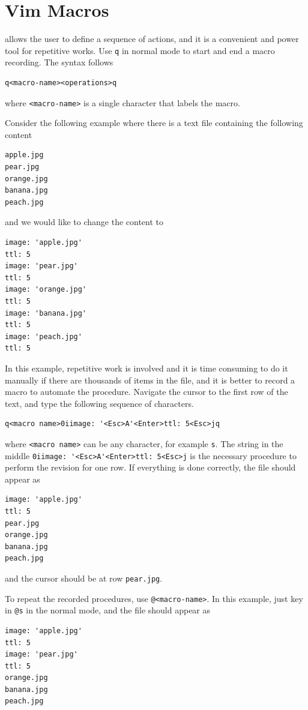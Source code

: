 \section{Vim Macros}

 allows the user to define a sequence of actions, and it is a convenient and power tool for repetitive works. Use \verb|q| in normal mode to start and end a macro recording. The syntax follows
\begin{lstlisting}
q<macro-name><operations>q
\end{lstlisting}
where \verb|<macro-name>| is a single character that labels the macro.

Consider the following example where there is a text file containing the following content
\begin{lstlisting}
apple.jpg
pear.jpg
orange.jpg
banana.jpg
peach.jpg
\end{lstlisting}
and we would like to change the content to
\begin{lstlisting}
image: 'apple.jpg'
ttl: 5
image: 'pear.jpg'
ttl: 5
image: 'orange.jpg'
ttl: 5
image: 'banana.jpg'
ttl: 5
image: 'peach.jpg'
ttl: 5
\end{lstlisting}

In this example, repetitive work is involved and it is time consuming to do it manually if there are thousands of items in the file, and it is better to record a macro to automate the procedure. Navigate the cursor to the first row of the text, and type the following sequence of characters.
\begin{lstlisting}
q<macro name>0iimage: '<Esc>A'<Enter>ttl: 5<Esc>jq
\end{lstlisting}
where \verb|<macro name>| can be any character, for example \verb|s|. The string in the middle \verb|0iimage: '<Esc>A'<Enter>ttl: 5<Esc>j| is the necessary procedure to perform the revision for one row. If everything is done correctly, the file should appear as
\begin{lstlisting}
image: 'apple.jpg'
ttl: 5
pear.jpg
orange.jpg
banana.jpg
peach.jpg
\end{lstlisting}
and the cursor should be at row \verb|pear.jpg|.

To repeat the recorded procedures, use \verb|@<macro-name>|. In this example, just key in \verb|@s| in the normal mode, and the file should appear as
\begin{lstlisting}
image: 'apple.jpg'
ttl: 5
image: 'pear.jpg'
ttl: 5
orange.jpg
banana.jpg
peach.jpg
\end{lstlisting}

